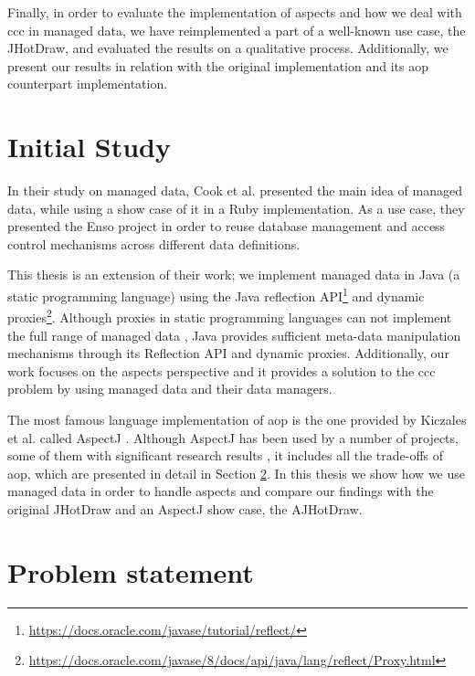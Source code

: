 Finally, in order to evaluate the implementation of aspects and how we deal with \ac{ccc} in managed data, we have reimplemented a part of a well-known use case, the JHotDraw, and evaluated the results on a qualitative process.
Additionally, we present our results in relation with the original implementation and its \ac{aop} counterpart implementation.

\section{Initial Study}\label{Initial Study}
In their study on managed data, Cook et al. \cite{loh2012managed} presented the main idea of managed data, while using a show case of it in a Ruby implementation. 
As a use case, they presented the Enso project in order to reuse database management and  access control mechanisms across different data definitions.

This thesis is an extension of their work; we implement managed data in Java (a static programming language) using the Java reflection API\footnote{\url{https://docs.oracle.com/javase/tutorial/reflect/}} and dynamic proxies\footnote{\url{https://docs.oracle.com/javase/8/docs/api/java/lang/reflect/Proxy.html}}. 
Although proxies in static programming languages can not implement the full range of managed data \cite{loh2012managed}, Java provides sufficient meta-data manipulation mechanisms through its Reflection API \cite{forman2004java} and dynamic proxies. 
Additionally, our work focuses on the aspects perspective and it provides a solution to the \ac{ccc} problem by using managed data and their data managers.

The most famous language implementation of \ac{aop} is the one provided by Kiczales et al. called AspectJ \cite{kiczales2001overview}. 
Although AspectJ has been used by a number of projects, some of them with significant research results \cite{hannemann2002design} \cite{marinajhotdraw}, it includes all the trade-offs of \ac{aop}, which are presented in detail in Section \ref{Problem statement}.
In this thesis we show how we use managed data in order to handle aspects and compare our findings with the original JHotDraw and an AspectJ show case, the AJHotDraw.

\section{Problem statement}\label{Problem statement}

